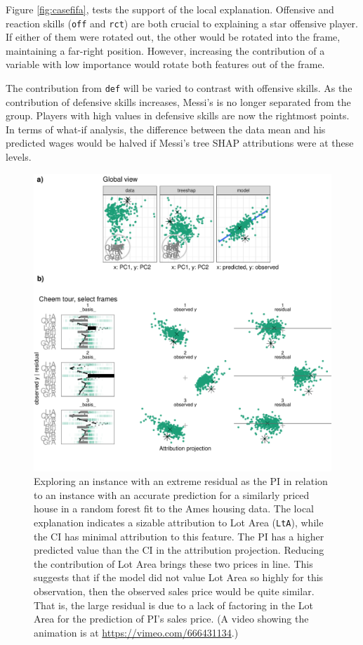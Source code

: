 \documentclass[11pt,twoside]{article}
\begin{document}
Figure \ref{fig:casefifa}, tests the support of the local explanation. Offensive and reaction skills (\texttt{off} and \texttt{rct}) are both crucial to explaining a star offensive player. If either of them were rotated out, the other would be rotated into the frame, maintaining a far-right position. However, increasing the contribution of a variable with low importance would rotate both features out of the frame.

The contribution from \texttt{def} will be varied to contrast with offensive skills. As the contribution of defensive skills increases, Messi's is no longer separated from the group. Players with high values in defensive skills are now the rightmost points. In terms of what-if analysis, the difference between the data mean and his predicted wages would be halved if Messi's tree SHAP attributions were at these levels.



\begin{figure}

{\centering \includegraphics[width=0.9\linewidth]{./figures/case_ames2018} 

}

\caption{Exploring an instance with an extreme residual as the PI in relation to an instance with an accurate prediction for a similarly priced house in a random forest fit to the Ames housing data. The local explanation indicates a sizable attribution to Lot Area (\texttt{LtA}), while the CI has minimal attribution to this feature. The PI has a higher predicted value than the CI in the attribution projection. Reducing the contribution of Lot Area brings these two prices in line. This suggests that if the model did not value Lot Area so highly for this observation, then the observed sales price would be quite similar. That is, the large residual is due to a lack of factoring in the Lot Area for the prediction of PI's sales price. (A video showing the animation is at \url{https://vimeo.com/666431134}.)}\label{fig:caseames}
\end{figure}
\end{document}
